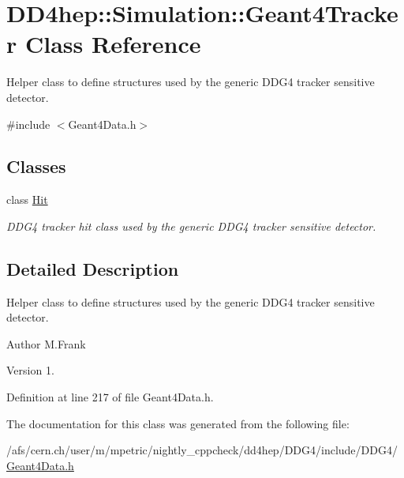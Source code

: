 \hypertarget{class_d_d4hep_1_1_simulation_1_1_geant4_tracker}{}\section{D\+D4hep\+:\+:Simulation\+:\+:Geant4\+Tracker Class Reference}
\label{class_d_d4hep_1_1_simulation_1_1_geant4_tracker}


Helper class to define structures used by the generic D\+D\+G4 tracker sensitive detector.  




{\ttfamily \#include $<$Geant4\+Data.\+h$>$}

\subsection*{Classes}
\begin{DoxyCompactItemize}
\item 
class \hyperlink{class_d_d4hep_1_1_simulation_1_1_geant4_tracker_1_1_hit}{Hit}
\begin{DoxyCompactList}\small\item\em D\+D\+G4 tracker hit class used by the generic D\+D\+G4 tracker sensitive detector. \end{DoxyCompactList}\end{DoxyCompactItemize}


\subsection{Detailed Description}
Helper class to define structures used by the generic D\+D\+G4 tracker sensitive detector. 

\begin{DoxyAuthor}{Author}
M.\+Frank 
\end{DoxyAuthor}
\begin{DoxyVersion}{Version}
1. 
\end{DoxyVersion}


Definition at line 217 of file Geant4\+Data.\+h.



The documentation for this class was generated from the following file\+:\begin{DoxyCompactItemize}
\item 
/afs/cern.\+ch/user/m/mpetric/nightly\+\_\+cppcheck/dd4hep/\+D\+D\+G4/include/\+D\+D\+G4/\hyperlink{_geant4_data_8h}{Geant4\+Data.\+h}\end{DoxyCompactItemize}

